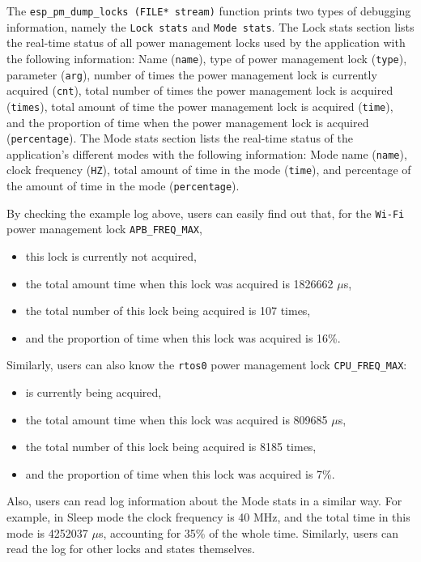 \documentclass[a4paper,12pt,openany]{book}
\begin{document}
The \verb|esp_pm_dump_locks (FILE* stream)| function prints two types of debugging information, namely the \verb|Lock stats| and \verb|Mode stats|. The Lock stats section lists the real-time status of all power management locks used by the application with the following information: Name (\verb|name|), type of power management lock (\verb|type|), parameter (\verb|arg|), number of times the power management lock is currently acquired (\verb|cnt|), total number of times the power management lock is acquired (\verb|times|), total amount of time the power management lock is acquired (\verb|time|), and the proportion of time when the power management lock is acquired (\verb|percentage|). The Mode stats section lists the real-time status of the application’s different modes with the following information: Mode name (\verb|name|), clock frequency (\verb|HZ|), total amount of time in the mode (\verb|time|), and percentage of the amount of time in the mode (\verb|percentage|).

By checking the example log above, users can easily find out that, for the \verb|Wi-Fi| power management lock \verb|APB_FREQ_MAX|, 

\begin{itemize}
    \parskip 0pt
    \item this lock is currently not acquired,
    \item the total amount time when this lock was acquired is 1826662 $\mu$s,
    \item the total number of this lock being acquired is 107 times,
    \item and the proportion of time when this lock was acquired is 16\%. 
\end{itemize}

Similarly, users can also know the \verb|rtos0| power management lock \verb|CPU_FREQ_MAX|:

\begin{itemize}
    \parskip 0pt
    \item is currently being acquired,
    \item the total amount time when this lock was acquired is 809685 $\mu$s,
    \item the total number of this lock being acquired is 8185 times,
    \item and the proportion of time when this lock was acquired is 7\%.
\end{itemize}

Also, users can read log information about the Mode stats in a similar way. For example, in Sleep mode the clock frequency is 40 MHz, and the total time in this mode is 4252037 $\mu$s, accounting for 35\% of the whole time. Similarly, users can read the log for other locks and states themselves.
\end{document}
